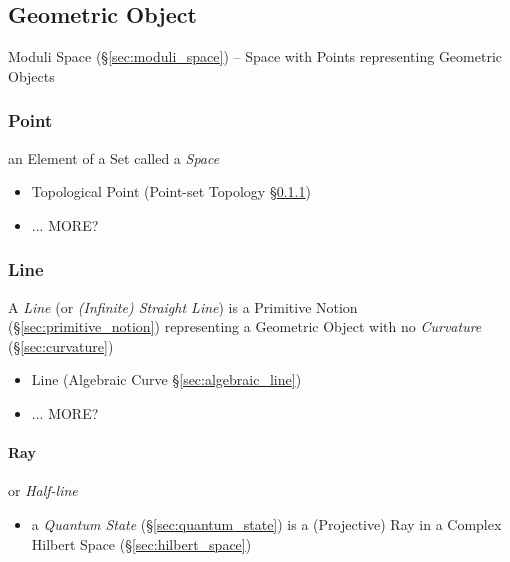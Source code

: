 \subsection{Geometric Object}\label{sec:geometric_object}

\fist Moduli Space (\S\ref{sec:moduli_space}) -- Space with Points representing
Geometric Objects



\subsubsection{Point}\label{sec:point}

an Element of a Set called a \emph{Space}

\begin{itemize}
  \item Topological Point (Point-set Topology \S\ref{sec:point})
  \item ... MORE?
\end{itemize}



\subsubsection{Line}\label{sec:line}

A \emph{Line} (or \emph{(Infinite) Straight Line}) is a Primitive Notion
(\S\ref{sec:primitive_notion}) representing a Geometric Object with no
\emph{Curvature} (\S\ref{sec:curvature})

\begin{itemize}
  \item Line (Algebraic Curve \S\ref{sec:algebraic_line})
  \item ... MORE?
\end{itemize}



\paragraph{Ray}\label{sec:ray}\hfill

or \emph{Half-line}

\begin{itemize}
  \item a \emph{Quantum State} (\S\ref{sec:quantum_state}) is a (Projective) Ray
    in a Complex Hilbert Space (\S\ref{sec:hilbert_space})
\end{itemize}



